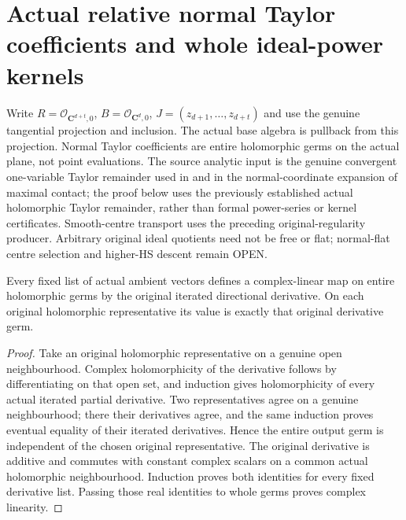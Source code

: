 \section{Actual relative normal Taylor coefficients and whole ideal-power kernels}
\label{sec:hironaka-relative-normal-taylor-coefficients}

Write $R=\mathcal O_{\mathbf C^{d+t},0}$, $B=\mathcal O_{\mathbf C^d,0}$,
$J=(z_{d+1},\ldots,z_{d+t})$ and use the genuine tangential projection and
inclusion. The actual base algebra is pullback from this projection. Normal
Taylor coefficients are entire holomorphic germs on the actual plane, not
point evaluations. The source analytic input is the genuine convergent
one-variable Taylor remainder used in \cite{bierstone-milman97-invent-math}
and in the normal-coordinate expansion of maximal contact; the proof below
uses the previously established actual holomorphic Taylor remainder, rather
than formal power-series or kernel certificates. Smooth-centre transport uses
the preceding original-regularity producer. Arbitrary original ideal quotients
need not be free or flat; normal-flat centre selection and higher-HS descent
remain OPEN.

\begin{lemma}
\label{hir:relative-normal-actual-iterated-derivative-germs}
\leanok
Every fixed list of actual ambient vectors defines a complex-linear map on
entire holomorphic germs by the original iterated directional derivative.
On each original holomorphic representative its value is exactly that
original derivative germ.
\end{lemma}
\begin{proof}
Take an original holomorphic representative on a genuine open neighbourhood.
Complex holomorphicity of the derivative follows by differentiating on that
open set, and induction gives holomorphicity of every actual iterated
partial derivative. Two representatives agree on a genuine neighbourhood;
there their derivatives agree, and the same induction proves eventual equality
of their iterated derivatives. Hence the entire output germ is independent
of the chosen original representative. The original derivative is additive
and commutes with constant complex scalars on a common actual holomorphic
neighbourhood. Induction proves both identities for every fixed derivative
list. Passing those real identities to whole germs proves complex linearity.
\end{proof}

